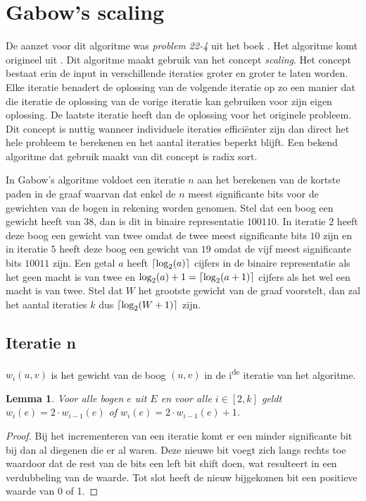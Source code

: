 \documentclass[conference]{IEEEtran}
\newtheorem{lemma}{Lemma}[section]
\theoremstyle{definition}
\theoremstyle{remark}
\DeclarePairedDelimiter{\ceil}{\lceil}{\rceil}
\begin{document}
\section{Gabow's scaling}
De aanzet voor dit algoritme was \textit{problem 22-4} uit het boek  \cite{Introduction}. Het algoritme komt origineel uit  \cite{Scaling}.
Dit algoritme maakt gebruik van het concept \textit{scaling}. Het concept bestaat erin de input in verschillende iteraties groter en groter te laten worden. Elke iteratie benadert de oplossing van de volgende iteratie op zo een manier dat die iteratie de oplossing van de vorige iteratie kan gebruiken voor zijn eigen oplossing. De laatste iteratie heeft dan de oplossing voor het originele probleem. Dit concept is nuttig wanneer individuele iteraties efficiënter zijn dan direct het hele probleem te berekenen en het aantal iteraties beperkt blijft. Een bekend algoritme dat gebruik maakt van dit concept is radix sort.

In Gabow's algoritme voldoet een iteratie $n$ aan het berekenen van de kortste paden in de graaf waarvan dat enkel de $n$ meest significante bits voor de gewichten van de bogen in rekening worden genomen. Stel dat een boog een gewicht heeft van $38$, dan is dit in binaire representatie $100110$. In iteratie $2$ heeft deze boog een gewicht van twee omdat de twee meest significante bits $10$ zijn en in iteratie $5$ heeft deze boog een gewicht van $19$ omdat de vijf meest significante bits $10011$ zijn. Een getal $a$ heeft $\ceil{\log_2(a)}$ cijfers in de binaire representatie als het geen macht is van twee en $\log_2(a) + 1 = \ceil{\log_2(a + 1)}$ cijfers als het wel een macht is van twee. Stel dat $W$ het grootste gewicht van de graaf voorstelt, dan zal het aantal iteraties $k$ dus $\ceil{\log_2(W + 1)}$ zijn.

\subsection{Iteratie n}
$w_i(u, v)$ is het gewicht van de boog $(u, v)$ in de i\textsuperscript{de} iteratie van het algoritme.
\begin{lemma} \label{scaling:doubleThePrevious}
    Voor alle bogen $e$ uit $E$ en voor alle $i \in [2, k]$ geldt $w_i(e) = 2 \cdot w_{i-1}(e)$ of $w_i(e) = 2 \cdot w_{i-1}(e) + 1$.
\end{lemma}
\begin{proof}
    Bij het incrementeren van een iteratie komt er een minder significante bit bij dan al diegenen die er al waren. Deze nieuwe bit voegt zich langs rechts toe waardoor dat de rest van de bits een left bit shift doen, wat resulteert in een verdubbeling van de waarde. Tot slot heeft de nieuw bijgekomen bit een positieve waarde van 0 of 1.
\end{proof}
\end{document}
